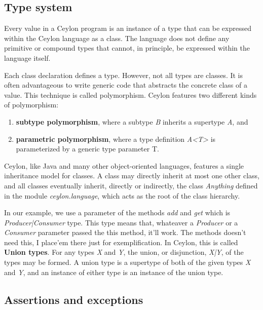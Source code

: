 \documentclass{abnt}
\begin{document}
\subsection{Type system}

Every value in a Ceylon program is an instance of a type that can be expressed
within the Ceylon language as a class. The language does not define any
primitive or compound types that cannot, in principle, be expressed within the
language itself.

Each class declaration defines a type. However, not all types are classes. It is
often advantageous to write generic code that abstracts the concrete class of a
value. This technique is called polymorphism. Ceylon features two different
kinds of polymorphism:

\begin{enumerate}
	\item \textbf{subtype polymorphism}, where a subtype \textit{B} inherits a supertype \textit{A}, and 
	\item \textbf{parametric polymorphism}, where a type definition \textit{A<T>} is parameterized by a generic type parameter T.
\end{enumerate}

Ceylon, like Java and many other object-oriented languages, features a single
inheritance model for classes. A class may directly inherit at most one other
class, and all classes eventually inherit, directly or indirectly, the class
\textit{Anything} defined in the module \textit{ceylon.language}, which acts as the root of
the class hierarchy.

In our example, we use a parameter of the methods \textit{add} and  \textit{get} which is
\textit{Producer|Consumer} type. This type means that, whateaver a \textit{Producer} or a
\textit{Consumer} parameter passed the this method, it'll work. The methods doesn't
need this, I place'em there just for exemplification. In Ceylon, this is called
\textbf{Union types}. For any types \textit{X} and \textit{Y}, the union, or disjunction, \textit{X|Y}, of
the types may be formed. A union type is a supertype of both of the given types
\textit{X} and \textit{Y}, and an instance of either type is an instance of the union type.

\subsection{Assertions and exceptions}
\end{document}
